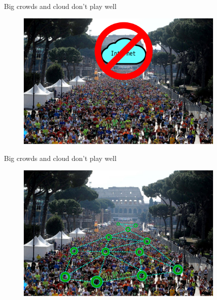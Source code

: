 \documentclass[presentation]{beamer}\mode<presentation>{\usetheme{sapere}}
\begin{document}
\begin{frame}{Big crowds and cloud don't play well}
  \centering
  \scriptsize
  \begin{figure}
    \includegraphics[width=0.90\textwidth]{imgs/no_internet} 
  \end{figure}
\end{frame}

\begin{frame}{Big crowds and cloud don't play well}
  \centering
  \scriptsize
  \begin{figure}
    \includegraphics[width=0.90\textwidth]{imgs/rome_mesh} 
  \end{figure}
\end{frame}
\end{document}
